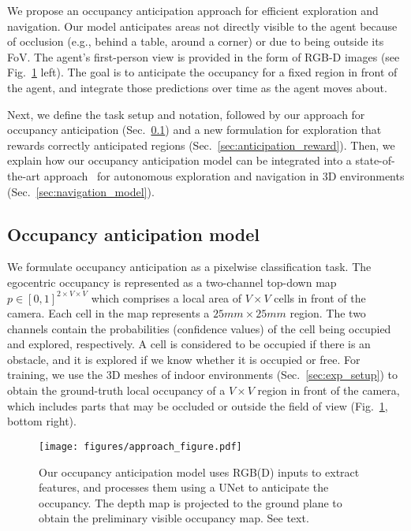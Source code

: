 \documentclass[runningheads]{llncs}
\begin{document}
We propose an occupancy anticipation approach for efficient exploration and navigation. Our model anticipates areas not directly visible to the agent because of occlusion (e.g., behind a table, around a corner) or due to being outside its FoV. The agent's first-person view is provided in the form of RGB-D images (see Fig.~\ref{fig:approach_figure} left). The goal is to anticipate the occupancy for a fixed region in front of the agent, and integrate those predictions over time as the agent moves about.

Next, we define the task setup and notation, followed by our approach for occupancy anticipation (Sec.~\ref{sec:occupancy_model}) and a new formulation for exploration that rewards correctly anticipated regions (Sec.~\ref{sec:anticipation_reward}). Then, we explain how our occupancy anticipation model can be integrated into a state-of-the-art approach~\cite{chaplot2020learning} for autonomous  exploration and navigation in 3D environments (Sec.~\ref{sec:navigation_model}).


\subsection{Occupancy anticipation model}\label{sec:occupancy_model}

We formulate occupancy anticipation as a pixelwise classification task. The egocentric occupancy is represented as a two-channel top-down map $p \in [0,1]^{2\times V \times V}$ which comprises a local area of $V \times V$ cells in front of the camera. Each cell in the map represents a $25\si{mm} \times 25\si{mm}$ region. The two channels contain the probabilities (confidence values) of the cell being occupied and explored, respectively. A cell is considered to be occupied if there is an obstacle, and it is explored if we know whether it is occupied or free. For training, we use the 3D meshes of indoor environments (Sec.~\ref{sec:exp_setup}) to obtain the ground-truth local occupancy of a $V \times V$ region in front of the camera, which includes parts that may be occluded or outside the field of view (Fig.~\ref{fig:approach_figure}, bottom right). 

\begin{figure}[t]
    \centering
    \texttt{[image: figures/approach\_figure.pdf]}
    \caption{\small Our occupancy anticipation model uses RGB(D) inputs to extract features, and processes them using a UNet to anticipate the occupancy. The depth map is projected to the ground plane to obtain the preliminary visible occupancy map.  See text.}  
    \label{fig:approach_figure}
\end{figure}
\end{document}

